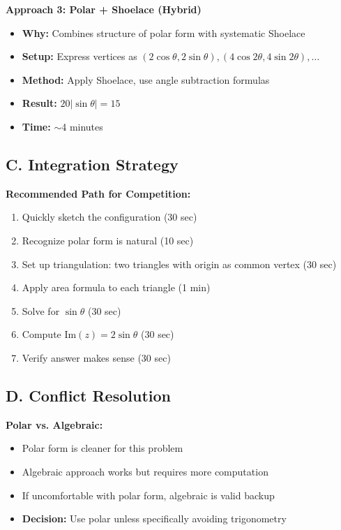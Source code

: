 \documentclass[12pt]{article}
\begin{document}
\begin{techniquesbox}
\textbf{Approach 3: Polar + Shoelace (Hybrid)}
\begin{itemize}
    \item \textbf{Why:} Combines structure of polar form with systematic Shoelace
    \item \textbf{Setup:} Express vertices as $(2\cos\theta, 2\sin\theta), (4\cos 2\theta, 4\sin 2\theta), \ldots$
    \item \textbf{Method:} Apply Shoelace, use angle subtraction formulas
    \item \textbf{Result:} $20|\sin\theta| = 15$
    \item \textbf{Time:} $\sim$4 minutes
\end{itemize}

\subsection*{C. Integration Strategy}

\textbf{Recommended Path for Competition:}
\begin{enumerate}
    \item Quickly sketch the configuration (30 sec)
    \item Recognize polar form is natural (10 sec)
    \item Set up triangulation: two triangles with origin as common vertex (30 sec)
    \item Apply area formula to each triangle (1 min)
    \item Solve for $\sin\theta$ (30 sec)
    \item Compute $\text{Im}(z) = 2\sin\theta$ (30 sec)
    \item Verify answer makes sense (30 sec)
\end{enumerate}

\subsection*{D. Conflict Resolution}

\textbf{Polar vs. Algebraic:}
\begin{itemize}
    \item Polar form is cleaner for this problem
    \item Algebraic approach works but requires more computation
    \item If uncomfortable with polar form, algebraic is valid backup
    \item \textbf{Decision:} Use polar unless specifically avoiding trigonometry
\end{itemize}
\end{techniquesbox}
\end{document}
